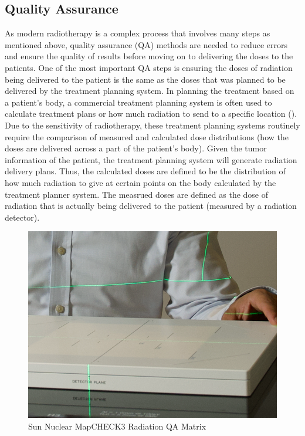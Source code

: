 \documentclass[12pt]{article}
\begin{document}
\subsection{Quality Assurance}
As modern radiotherapy is a complex process that involves many steps as mentioned above, quality assurance (QA) methods are needed to reduce errors and ensure the quality of results before moving on to delivering the doses to the patients. One of the most important QA steps is ensuring the doses of radiation being delivered to the patient is the same as the doses that was planned to be delivered by the treatment planning system. In planning the treatment based on a patient’s body, a commercial treatment planning system is often used to calculate treatment plans or how much radiation to send to a specific location (\textcite{Gardner}). Due to the sensitivity of radiotherapy, these treatment planning systems routinely require the comparison of measured and calculated dose distributions (how the doses are delivered across a part of the patient’s body). Given the tumor information of the patient, the treatment planning system will generate radiation delivery plans. Thus, the calculated doses are defined to be the distribution of how much radiation to give at certain points on the body calculated by the treatment planner system. The measrued doses are defined as the dose of radiation that is actually being delivered to the patient (measured by a radiation detector).


\begin{figure}[h]
  \centering
  \includegraphics[scale=1.2]{images/map.png}
  \caption{Sun Nuclear MapCHECK3 Radiation QA Matrix}
  \label{fig:mat}
\end{figure}
\end{document}
